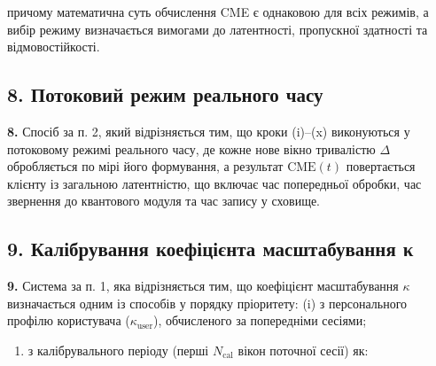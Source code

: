 \documentclass[12pt,a4paper]{article}
\begin{document}
причому математична суть обчислення CME є однаковою для всіх режимів, а вибір режиму визначається вимогами до латентності, пропускної здатності та відмовостійкості.



\subsection{8. Потоковий режим реального часу}\label{ux43fux43eux442ux43eux43aux43eux432ux438ux439-ux440ux435ux436ux438ux43c-ux440ux435ux430ux43bux44cux43dux43eux433ux43e-ux447ux430ux441ux443}



\textbf{8.} Спосіб за п. 2, який відрізняється тим, що кроки (i)--(x) виконуються у потоковому режимі реального часу, де кожне нове вікно тривалістю \(\Delta\) обробляється по мірі його формування, а результат \(\text{CME}(t)\) повертається клієнту із загальною латентністю, що включає час попередньої обробки, час звернення до квантового модуля та час запису у сховище.



\subsection{9. Калібрування коефіцієнта масштабування κ}\label{ux43aux430ux43bux456ux431ux440ux443ux432ux430ux43dux43dux44f-ux43aux43eux435ux444ux456ux446ux456ux454ux43dux442ux430-ux43cux430ux441ux448ux442ux430ux431ux443ux432ux430ux43dux43dux44f-ux3ba}



\textbf{9.} Система за п. 1, яка відрізняється тим, що коефіцієнт масштабування \(\kappa\) визначається одним із способів у порядку пріоритету: (i) з персонального профілю користувача (\(\kappa_{\text{user}}\)), обчисленого за попередніми сесіями;



\begin{enumerate}

\def\labelenumi{(\roman{enumi})}

\setcounter{enumi}{1}

\tightlist

\item

  з калібрувального періоду (перші \(N_{\text{cal}}\) вікон поточної сесії) як:

\end{enumerate}
\end{document}
